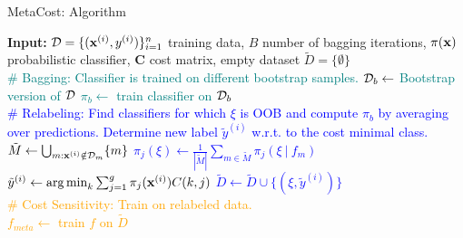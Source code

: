 \documentclass[11pt,compress,t,notes=noshow, xcolor=table]{beamer}
\begin{document}
\begin{vbframe}{MetaCost: Algorithm}
	
		

		
			\begin{algorithmic}
				
				\scriptsize
%				
				\State \textbf{Input:} 
				$\mathcal{D} = \{(\mathbf{x}^{(i)},y^{(i)})\}_{i=1}^n$ training data, $B$ number of bagging iterations,
				$\pi(\mathbf{x})$ probabilistic classifier,
				$\mathbf{C}$ cost matrix, empty dataset $\tilde D=\{\emptyset\}$ \\
				 \textcolor{teal}{\# Bagging: Classifier is trained on different bootstrap samples.
    \State $\mathcal{D}_b \leftarrow $ Bootstrap version of $\mathcal{D}$
    \State $\pi_b \leftarrow $ train classifier on $\mathcal{D}_b$ 
\EndFor 
\\
\textcolor{blue}{\# Relabeling: Find classifiers for which $\xi$ is OOB and compute $\pi_b$ by averaging over predictions.
Determine new label $\tilde y^{(i)}$ w.r.t. to the cost minimal class.
 	 \State $\tilde M \leftarrow \bigcup_{m: \mathbf{x}^{(i)} \notin \mathcal{D}_m} \{m\}$ 
\EndFor
{} 
    \State $\pi_j(\xi)  \leftarrow \frac{1}{|\tilde M| } \sum_{m \in \tilde M}   \pi_j(\xi~|~ f_m) $
\EndFor
{}
\State $\tilde y^{(i)} \leftarrow \operatorname{arg\,min}_{k} \sum_{j=1}^g \pi_j(\mathbf{x}^{(i)}) C(k,j) $
\State $\tilde D \leftarrow \tilde D \cup \{(\xi,\tilde y^{(i)})\} $
\EndFor}}  
\\
\textcolor{orange}{\# Cost Sensitivity: Train on relabeled data.\\
$f_{meta} \leftarrow$ train $f$ on $\tilde D$}
\end{algorithmic}

\end{vbframe}

\endlecture
\end{document}
